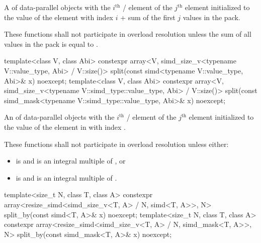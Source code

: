 \begin{itemdescr}
  \pnum\returns
  A  of data-parallel objects with the $i^\text{th}$ / element of the $j^\text{th}$  element initialized to the value of the element  with index $i$ + sum of the first $j$ values in the  pack.

  \pnum\remarks
  These functions shall not participate in overload resolution unless the sum of all values in the  pack is equal to .
\end{itemdescr}

\begin{itemdecl}
template<class V, class Abi>
  constexpr array<V, simd_size_v<typename V::value_type, Abi> / V::size()>
    split(const simd<typename V::value_type, Abi>& x) noexcept;
template<class V, class Abi>
  constexpr array<V, simd_size_v<typename V::simd_type::value_type, Abi> / V::size()>
    split(const simd_mask<typename V::simd_type::value_type, Abi>& x) noexcept;
\end{itemdecl}

\begin{itemdescr}
  \pnum\returns
  An  of data-parallel objects with the $i^\text{th}$ / element of the $j^\text{th}$  element initialized to the value of the element in  with index .

  \pnum\remarks
  These functions shall not participate in overload resolution unless either:
  \begin{itemize}
    \item {} is  and  is an integral multiple of , or
    \item {} is  and  is an integral multiple of .
  \end{itemize}
\end{itemdescr}

\begin{itemdecl}
template<size_t N, class T, class A>
  constexpr array<resize_simd<simd_size_v<T, A> / N, simd<T, A>>, N>
    split_by(const simd<T, A>& x) noexcept;
template<size_t N, class T, class A>
  constexpr array<resize_simd<simd_size_v<T, A> / N, simd_mask<T, A>>, N>
    split_by(const simd_mask<T, A>& x) noexcept;
\end{itemdecl}

